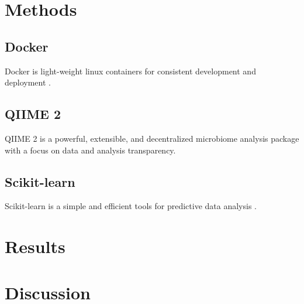 \documentclass[11pt, a4paper]{article}
\begin{document}
    \section{Methods}
        \subsection{Docker}
            Docker is light-weight linux containers for consistent development and deployment \cite{docker1}.

        \subsection{QIIME 2}
            QIIME 2 is a powerful, extensible, and decentralized microbiome analysis package with a focus on data and analysis transparency.

        \subsection{Scikit-learn}
            Scikit-learn is a simple and efficient tools for predictive data analysis \cite{sklearn1, sklearn2}.

    \section{Results}

    \section{Discussion}

    
    
\end{document}
